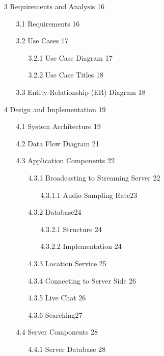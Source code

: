 \documentclass{article}
\begin{document}
\begin{itemize}
\begin{itemize}
\begin{itemize}
		\end{itemize}
	\end{itemize}
    	\item [3] Requirements and Analysis \hfill16
	\begin{itemize}
		\item [3.1] Requirements \hfill16
		\item [3.2] Use Cases \hfill17
		\begin{itemize}
			\item [3.2.1] Use Case Diagram \hfill17
			\item [3.2.2] Use Case Titles \hfill18
		\end{itemize}
		\item [3.3] Entity-Relationship (ER) Diagram \hfill18
	\end{itemize}
	\item [4] Design and Implementation \hfill19
	\begin{itemize}
		\item [4.1] System Architecture \hfill19
		\item [4.2] Data Flow Diagram \hfill21
		\item [4.3] Application Components \hfill22
		\begin{itemize}
			\item [4.3.1] Broadcasting to Streaming Server \hfill22 
			\begin{itemize}
				\item [4.3.1.1] Audio Sampling Rate\hfill23 
			\end{itemize}
			\item [4.3.2] Database\hfill24
			\begin{itemize}
				\item [4.3.2.1] Structure \hfill24
				\item [4.3.2.2] Implementation \hfill24
			\end{itemize}
			\item [4.3.3] Location Service \hfill25
			\item [4.3.4] Connecting to Server Side \hfill26
			\item [4.3.5] Live Chat \hfill26 
			\item [4.3.6] Searching\hfill27
		\end{itemize}
		\item [4.4] Server Components \hfill28
		\begin{itemize}
			\item [4.4.1] Server Database \hfill28
			\begin{itemize}

\end{itemize}
\end{itemize}
\end{itemize}
\end{itemize}
\end{document}
